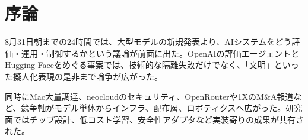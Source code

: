 \section{序論}
8月31日朝までの24時間では、大型モデルの新規発表より、AIシステムをどう評価・運用・制御するかという議論が前面に出た。OpenAIの評価エージェントとHugging Faceをめぐる事案では、技術的な隔離失敗だけでなく、「文明」といった擬人化表現の是非まで論争が広がった。

同時にMac大量調達、neocloudのセキュリティ、OpenRouterや1XのM\&A報道など、競争軸がモデル単体からインフラ、配布層、ロボティクスへ広がった。研究面ではチップ設計、低コスト学習、安全性アダプタなど実装寄りの成果が共有された。

